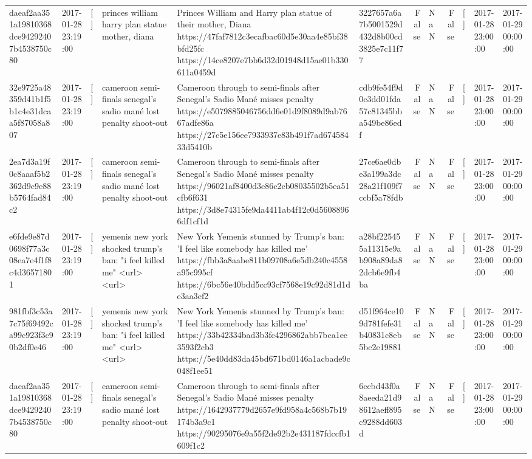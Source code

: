 \begin{tabular}{llllllrlrlll}
daeaf2aa351a19810368dce94292407b4538750c80 & 2017-01-28 23:19:00 & [] & princes william harry plan statue mother, diana & Princes William and Harry plan statue of their mother, Diana https://47faf7812c3ecafbac60d5e30aa4e85bf38bfd25fc https://14ce8207e7bb6d32d01948d15ae01b330611a0459d & 3227657a6a7b5001529d432d8b00cd3825e7c11f77 & False & NaN & False & [] & 2017-01-28 23:00:00 & 2017-01-29 00:00:00 \\
32e9725a48359d41b1f5b1c4e31dcaa5f87058a807 & 2017-01-28 23:19:00 & [] & cameroon semi-finals senegal's sadio mané lost penalty shoot-out & Cameroon through to semi-finals after Senegal’s Sadio Mané misses penalty https://e5079885046756dd6e01d9f8089d9ab7667adfe86a https://27c5e156ee7933937e83b491f7ad67458433d5410b & cdb9fe54f9d0c3dd01fda57c81345bba549be86edf & False & NaN & False & [] & 2017-01-28 23:00:00 & 2017-01-29 00:00:00 \\
2ea7d3a19f0c8aaaf5b2362d9c9e88b5764fad84c2 & 2017-01-28 23:19:00 & [] & cameroon semi-finals senegal's sadio mané lost penalty shoot-out & Cameroon through to semi-finals after Senegal’s Sadio Mané misses penalty https://96021af8400d3e86c2cb08035502b5ea51cfb6f631 https://3d8e74315fe9da4411ab4f12c0d56088966df1cf1d & 27ce6ae0dbe3a199a3dc28a21f109f7ccbf5a78fdb & False & NaN & False & [] & 2017-01-28 23:00:00 & 2017-01-29 00:00:00 \\
e6fde9e87d0698f77a3c08ea7e4f1f8c4d36571801 & 2017-01-28 23:19:00 & [] & yemenis new york shocked trump's ban: "i feel killed me" <url> <url> & New York Yemenis stunned by Trump's ban: 'I feel like somebody has killed me' https://fbb3a8aabe811b09708a6e5db240c4558a95c995cf https://6bc56e40bdd5cc93cf7568e19c92d81d1de3aa3ef2 & a28bf225455a11315e9ab908a89da82dcb6e9fb4ba & False & NaN & False & [] & 2017-01-28 23:00:00 & 2017-01-29 00:00:00 \\
981fbf3c53a7c75f69492ca99c923f3c90b2df0e46 & 2017-01-28 23:19:00 & [] & yemenis new york shocked trump's ban: "i feel killed me" <url> <url> & New York Yemenis stunned by Trump's ban: 'I feel like somebody has killed me' https://33b42334bad3b3fc4296862abb7bca1ee3593f2cb3 https://5e40dd83da45bd671bd0146a1acbade9c048f1ee51 & d51f964ce109d781fefe31b40831c8eb5bc2e19881 & False & NaN & False & [] & 2017-01-28 23:00:00 & 2017-01-29 00:00:00 \\
daeaf2aa351a19810368dce94292407b4538750c80 & 2017-01-28 23:19:00 & [] & cameroon semi-finals senegal's sadio mané lost penalty shoot-out & Cameroon through to semi-finals after Senegal’s Sadio Mané misses penalty https://1642937779d2657e9fd958a4c568b7b19174b3a9c1 https://90295076e9a55f2de92b2e431187fdccfb1609f1c2 & 6ccbd43f0a8aeeda21d98612aeff895c9288dd603d & False & NaN & False & [] & 2017-01-28 23:00:00 & 2017-01-29 00:00:00 \\

\end{tabular}
